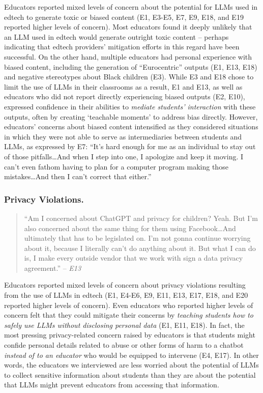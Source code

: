 \noindent Educators reported mixed levels of concern about the potential for LLMs used in edtech to generate toxic or biased content (E1, E3-E5, E7, E9, E18, and E19 reported higher levels of concern). Most educators found it deeply unlikely that an LLM used in edtech would generate outright toxic content -- perhaps indicating that edtech providers' mitigation efforts in this regard have been successful. On the other hand, multiple educators had personal experience with biased content, including the generation of ``Eurocentric'' outputs (E1, E13, E18) and negative stereotypes about Black children (E3). While E3 and E18 chose to limit the use of LLMs in their classrooms as a result, E1 and E13, as well as educators who did not report directly experiencing biased outputs (E2, E10), expressed confidence in their abilities to \textit{mediate students' interaction} with these outputs, often by creating `teachable moments' to address bias directly. However, educators' concerns about biased content intensified as they considered situations in which they were not able to serve as intermediaries between students and LLMs, as expressed by E7: ``It's hard enough for me as an individual to stay out of those pitfalls\ldots And when I step into one, I apologize and keep it moving. I can't even fathom having to plan for a computer program making those mistakes\ldots And then I can’t correct that either.'' 

\subsubsection*{Privacy Violations.}
\begin{quote}
    ``Am I concerned about ChatGPT and privacy for children? Yeah. But I'm also concerned about the same thing for them using Facebook\ldots And ultimately that has to be legislated on. I'm not gonna continue worrying about it, because I literally can't do anything about it. But what I can do is, I make every outside vendor that we work with sign a data privacy agreement.'' -- \textit{E13}
\end{quote}

\noindent Educators reported mixed levels of concern about privacy violations resulting from the use of LLMs in edtech (E1, E4-E6, E9, E11, E13, E17, E18, and E20 reported higher levels of concern). Even educators who reported higher levels of concern felt that they could mitigate their concerns by \textit{teaching students how to safely use LLMs without disclosing personal data} (E1, E11, E18). In fact, the most pressing privacy-related concern raised by educators is that students might confide personal details related to abuse or other forms of harm to a chatbot \textit{instead of to an educator} who would be equipped to intervene (E4, E17). In other words, the educators we interviewed are less worried about the potential of LLMs to collect sensitive information about students than they are about the potential that LLMs might prevent educators from accessing that information. 

